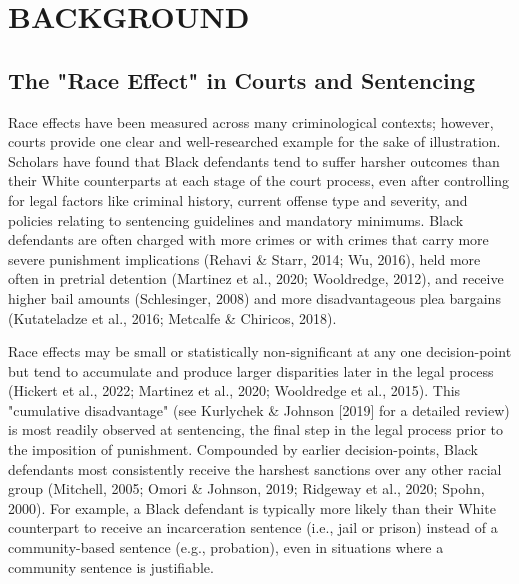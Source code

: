 \documentclass[titlepage]{article}
\begin{document}
\section{BACKGROUND}

\subsection{The "Race Effect" in Courts and Sentencing}
Race effects have been measured across many criminological contexts; however, courts provide one clear and well-researched example for the sake of illustration. Scholars have found that Black defendants tend to suffer harsher outcomes than their White counterparts at each stage of the court process, even after controlling for legal factors like criminal history, current offense type and severity, and policies relating to sentencing guidelines and mandatory minimums. Black defendants are often charged with more crimes or with crimes that carry more severe punishment implications (Rehavi \& Starr, 2014; Wu, 2016), held more often in pretrial detention (Martinez et al., 2020; Wooldredge, 2012), and receive higher bail amounts (Schlesinger, 2008) and more disadvantageous plea bargains (Kutateladze et al., 2016; Metcalfe \& Chiricos, 2018).

Race effects may be small or statistically non-significant at any one decision-point but tend to accumulate and produce larger disparities later in the legal process (Hickert et al., 2022; Martinez et al., 2020; Wooldredge et al., 2015). This "cumulative disadvantage" (see Kurlychek \& Johnson [2019] for a detailed review) is most readily observed at sentencing, the final step in the legal process prior to the imposition of punishment. Compounded by earlier decision-points, Black defendants most consistently receive the harshest sanctions over any other racial group (Mitchell, 2005; Omori \& Johnson, 2019; Ridgeway et al., 2020; Spohn, 2000). For example, a Black defendant is typically more likely than their White counterpart to receive an incarceration sentence (i.e., jail or prison) instead of a community-based sentence (e.g., probation), even in situations where a community sentence is justifiable. 
\end{document}
